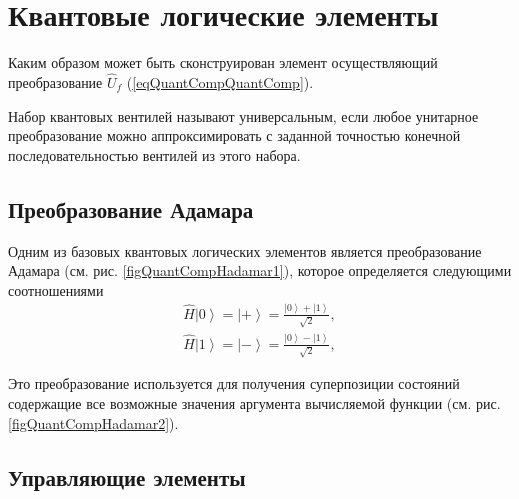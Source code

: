 \section{Квантовые логические элементы}
Каким образом может быть сконструирован элемент осуществляющий
преобразование $\hat{U}_f$ (\ref{eqQuantCompQuantComp}).

Набор квантовых вентилей называют универсальным, если любое унитарное
преобразование можно аппроксимировать с заданной точностью конечной
последовательностью вентилей из этого набора.

\subsection{Преобразование Адамара}

Одним из базовых квантовых логических элементов является
преобразование Адамара (см. рис. \ref{figQuantCompHadamar1}), которое
определяется следующими соотношениями
\begin{eqnarray}
\hat{H} \left|0\right> = \left|+\right> =  
\frac{\left|0\right> + \left|1\right> }{\sqrt{2}},
\nonumber \\
\hat{H} \left|1\right> = \left|-\right> = 
\frac{\left|0\right> - \left|1\right> }{\sqrt{2}},
\nonumber
\end{eqnarray}



Это преобразование используется для получения суперпозиции состояний
содержащие все возможные значения аргумента вычисляемой функции
(см. рис. \ref{figQuantCompHadamar2}). 



\subsection{Управляющие элементы}






 


